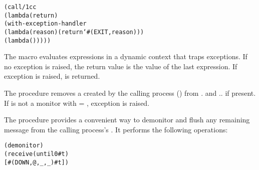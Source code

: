 \begin{syntax}
\end{syntax}
\expandsto{}\begin{alltt}\antipar
(call/1cc
 (lambda (return)
   (with-exception-handler
    (lambda (reason) (return `#(EXIT ,reason)))
    (lambda ()   \etc{}))))\end{alltt}

The  macro evaluates expressions  
\etc{} in a dynamic context that traps exceptions.  If no exception is
raised, the return value is the value of the last expression. If
exception  is raised,  is
returned.

\begin{procedure}
\end{procedure}
\returns{} 

The  procedure removes a  created by
the calling process () from . and
.. if present.  If
 is not a monitor with  = ,
exception  is raised.

\begin{procedure}
\end{procedure}
\returns{} 

The  procedure provides a convenient way to
demonitor and flush any remaining  message from the
calling process's . It performs the following operations:
\antipar\begin{alltt}
(demonitor )
(receive (until 0 #t)
  [#(DOWN ,@ ,_ ,_) #t])
\end{alltt}

\begin{procedure}
\end{procedure}
\returns{} 

